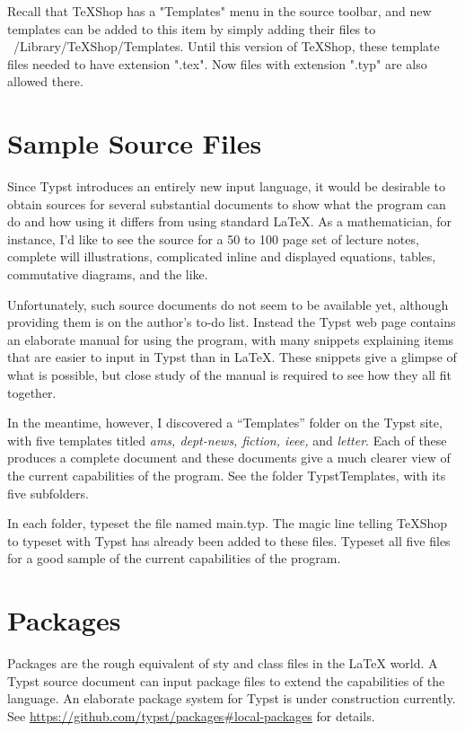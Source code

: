 \documentclass[11pt, oneside]{article}   	%
\begin{document}
Recall that TeXShop has a "Templates" menu in the source toolbar, and new templates can be added to this
item by simply adding their files to ~/Library/TeXShop/Templates. Until this version of TeXShop, these template
files needed to have extension ".tex". Now files with extension ".typ" are also allowed there.

\newpage
\section{Sample Source Files}

Since Typst introduces an entirely new input language, it would be desirable to obtain sources for several substantial documents to show what the program can do and how using it differs from using standard LaTeX.  As a mathematician, 
for instance, I'd like to see the source for a 50 to 100 page set of lecture notes, complete will illustrations, complicated inline and displayed equations, tables, commutative diagrams, and the like.

Unfortunately, such source documents do not seem to be available yet, although providing them is on the author's to-do list. Instead the Typst web page contains an elaborate manual for using the program, with many snippets explaining items that are easier to input in Typst than in LaTeX.  These snippets give a glimpse of what is possible, but close study
of the manual is required to see how they all fit together.

In the meantime, however, I discovered a ``Templates'' folder on the Typst site, with five templates titled
{\em ams, dept-news, fiction, ieee,} and {\em letter}. Each of these produces a complete document  and these documents give a much clearer view of the current capabilities of the program.  See the folder TypstTemplates, with its five subfolders.

In each folder, typeset the file named main.typ. The magic line telling TeXShop to typeset with Typst has already
been added to these files. Typeset all five files for a good sample of the current capabilities of the program.

\section{Packages}

Packages are the rough equivalent of sty and class files in the LaTeX world. A Typst source document can input package files to extend the capabilities of the language.  An elaborate package system for Typst is under construction currently. See \url{https://github.com/typst/packages#local-packages} for details.
\end{document}
